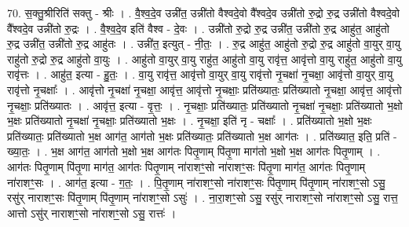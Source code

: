 \documentclass[17pt]{extarticle}
\begin{document}
70. स॒क्तु॒श्रीरिति॑ सक्तु - श्रीः । . वै॒श्व॒दे॒व उन्नी॑त॒ उन्नी॑तो वैश्वदे॒वो वै᳚श्वदे॒व उन्नी॑तो रु॒द्रो रु॒द्र उन्नी॑तो वैश्वदे॒वो वै᳚श्वदे॒व उन्नी॑तो रु॒द्रः । . वै॒श्व॒दे॒व इति॑ वैश्व - दे॒वः । . उन्नी॑तो रु॒द्रो रु॒द्र उन्नी॑त॒ उन्नी॑तो रु॒द्र आहु॑त॒ आहु॑तो रु॒द्र उन्नी॑त॒ उन्नी॑तो रु॒द्र आहु॑तः । . उन्नी॑त॒ इत्युत् - नी॒तः॒ । . रु॒द्र आहु॑त॒ आहु॑तो रु॒द्रो रु॒द्र आहु॑तो वा॒युर् वा॒यु राहु॑तो रु॒द्रो रु॒द्र आहु॑तो वा॒युः । . आहु॑तो वा॒युर् वा॒यु राहु॑त॒ आहु॑तो वा॒यु रावृ॑त्त॒ आवृ॑त्तो वा॒यु राहु॑त॒ आहु॑तो वा॒यु रावृ॑त्तः । . आहु॑त॒ इत्या - हु॒तः॒ । . वा॒यु रावृ॑त्त॒ आवृ॑त्तो वा॒युर् वा॒यु रावृ॑त्तो नृ॒चक्षा॑ नृ॒चक्षा॒ आवृ॑त्तो वा॒युर् वा॒यु रावृ॑त्तो नृ॒चक्षाः᳚ । . आवृ॑त्तो नृ॒चक्षा॑ नृ॒चक्षा॒ आवृ॑त्त॒ आवृ॑त्तो नृ॒चक्षाः॒ प्रति॑ख्यातः॒ प्रति॑ख्यातो नृ॒चक्षा॒ आवृ॑त्त॒ आवृ॑त्तो नृ॒चक्षाः॒ प्रति॑ख्यातः । . आवृ॑त्त॒ इत्या - वृ॒त्तः॒ । . नृ॒चक्षाः॒ प्रति॑ख्यातः॒ प्रति॑ख्यातो नृ॒चक्षा॑ नृ॒चक्षाः॒ प्रति॑ख्यातो भ॒क्षो भ॒क्षः प्रति॑ख्यातो 
नृ॒चक्षा॑ नृ॒चक्षाः॒ प्रति॑ख्यातो भ॒क्षः । . नृ॒चक्षा॒ इति॑ नृ - चक्षाः᳚ । . प्रति॑ख्यातो भ॒क्षो भ॒क्षः प्रति॑ख्यातः॒ प्रति॑ख्यातो भ॒क्ष आग॑त॒ आग॑तो भ॒क्षः प्रति॑ख्यातः॒ प्रति॑ख्यातो भ॒क्ष आग॑तः । . प्रति॑ख्यात॒ इति॒ प्रति॑ - ख्या॒तः॒ । . भ॒क्ष आग॑त॒ आग॑तो भ॒क्षो भ॒क्ष आग॑तः पितृ॒णाम् पि॑तृ॒णा माग॑तो भ॒क्षो भ॒क्ष आग॑तः पितृ॒णाम् । . आग॑तः पितृ॒णाम् पि॑तृ॒णा माग॑त॒ आग॑तः पितृ॒णाम् ना॑राशꣳ॒॒सो ना॑राशꣳ॒॒सः पि॑तृ॒णा माग॑त॒ आग॑तः पितृ॒णाम् ना॑राशꣳ॒॒सः । . आग॑त॒ इत्या - ग॒तः॒ । . पि॒तृ॒णाम् ना॑राशꣳ॒॒सो ना॑राशꣳ॒॒सः पि॑तृ॒णाम् पि॑तृ॒णाम् ना॑राशꣳ॒॒सो ऽसु॒ रसु॑र् नाराशꣳ॒॒सः पि॑तृ॒णाम् पि॑तृ॒णाम् ना॑राशꣳ॒॒सो ऽसुः॑ । . ना॒रा॒शꣳ॒॒सो ऽसु॒ रसु॑र् नाराशꣳ॒॒सो ना॑राशꣳ॒॒सो ऽसु॒ रात्त॒ आत्तो ऽसु॑र् नाराशꣳ॒॒सो ना॑राशꣳ॒॒सो ऽसु॒ रात्तः॑ । \newline
\end{document}
